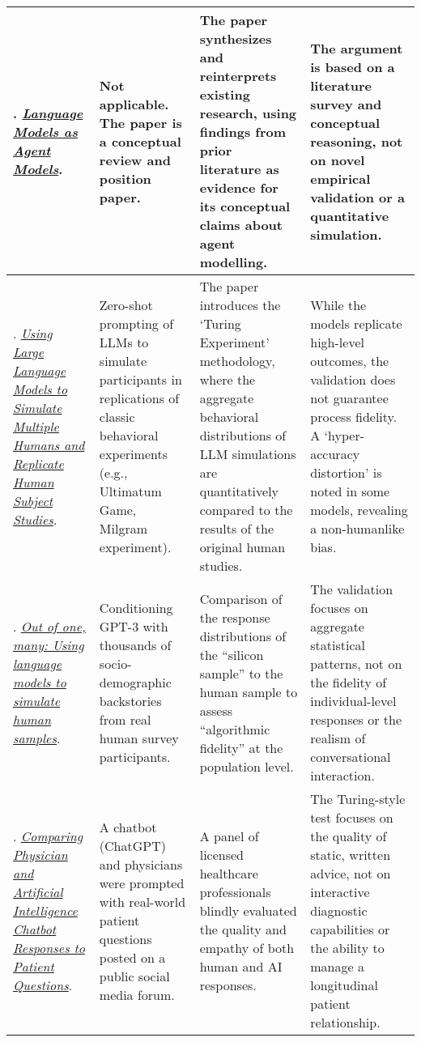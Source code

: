 {\begin{longtable}{| L{4.5cm} | L{3.5cm} | L{3.5cm} | L{3.5cm} |}
\citet{andreas-2022-language}. \href{https://aclanthology.org/2022.findings-emnlp.423/}{\textit{Language Models as Agent Models}}. & Not applicable. The paper is a conceptual review and position paper. & The paper synthesizes and reinterprets existing research, using findings from prior literature as evidence for its conceptual claims about agent modelling. & The argument is based on a literature survey and conceptual reasoning, not on novel empirical validation or a quantitative simulation.
\\\hline
\citet{aher2023}. \href{https://proceedings.mlr.press/v202/aher23a.html}{\textit{Using Large Language Models to Simulate Multiple Humans and Replicate Human Subject Studies}}. & Zero-shot prompting of LLMs to simulate participants in replications of classic behavioral experiments (e.g., Ultimatum Game, Milgram experiment). & The paper introduces the `Turing Experiment' methodology, where the aggregate behavioral distributions of LLM simulations are quantitatively compared to the results of the original human studies. & While the models replicate high-level outcomes, the validation does not guarantee process fidelity. A `hyper-accuracy distortion' is noted in some models, revealing a non-humanlike bias.
\\\hline
\citet{argyle2023}. \href{https://doi.org/10.1017/pan.2023.2}{\textit{Out of one, many: Using language models to simulate human samples}}. & Conditioning GPT-3 with thousands of socio-demographic backstories from real human survey participants. & Comparison of the response distributions of the ``silicon sample'' to the human sample to assess ``algorithmic fidelity'' at the population level. & The validation focuses on aggregate statistical patterns, not on the fidelity of individual-level responses or the realism of conversational interaction.
\\\hline
\citet{ayers2023social}. \href{https://jamanetwork.com/journals/jamainternalmedicine/fullarticle/2804309}{\textit{Comparing Physician and Artificial Intelligence Chatbot Responses to Patient Questions}}. & A chatbot (ChatGPT) and physicians were prompted with real-world patient questions posted on a public social media forum. & A panel of licensed healthcare professionals blindly evaluated the quality and empathy of both human and AI responses. & The Turing-style test focuses on the quality of static, written advice, not on interactive diagnostic capabilities or the ability to manage a longitudinal patient relationship.

\end{longtable}}
